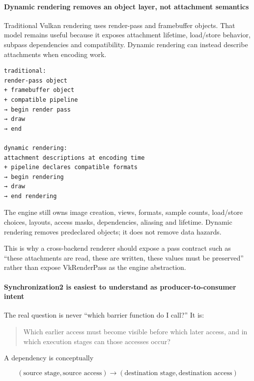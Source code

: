 \paragraph{Dynamic rendering removes an object layer, not attachment semantics}\label{dynamic-rendering-removes-an-object-layer-not-attachment-semantics}

Traditional Vulkan rendering uses render-pass and framebuffer objects. That model remains useful because it exposes attachment lifetime, load/store behavior, subpass dependencies and compatibility. Dynamic rendering can instead describe attachments when encoding work.

\begin{verbatim}
traditional:
render-pass object
+ framebuffer object
+ compatible pipeline
→ begin render pass
→ draw
→ end

dynamic rendering:
attachment descriptions at encoding time
+ pipeline declares compatible formats
→ begin rendering
→ draw
→ end rendering
\end{verbatim}

The engine still owns image creation, views, formats, sample counts, load/store choices, layouts, access masks, dependencies, aliasing and lifetime. Dynamic rendering removes predeclared objects; it does not remove data hazards.

This is why a cross-backend renderer should expose a pass contract such as ``these attachments are read, these are written, these values must be preserved'' rather than expose VkRenderPass as the engine abstraction.

\paragraph{Synchronization2 is easiest to understand as producer-to-consumer intent}\label{synchronization2-is-easiest-to-understand-as-producer-to-consumer-intent}

The real question is never ``which barrier function do I call?'' It is:

\begin{quote}
Which earlier access must become visible before which later access, and in which execution stages can those accesses occur?
\end{quote}

A dependency is conceptually

\[
\boxed{
(\text{source stage},\text{source access})
\rightarrow
(\text{destination stage},\text{destination access})
}
\]

